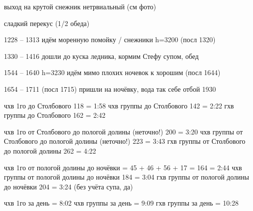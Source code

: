 выход на крутой снежник нетрвиальный (см фото)

сладкий перекус (1/2 обеда)

1228 -- 1313 идём моренную помойку / снежники h=3200 (посл 1320)

1330 -- 1416 дошли до куска ледника, кормим Стефу супом, обед

1544 -- 1640 h=3230 идём мимо плохих ночевок к хорошим (посл 1644)

1654 -- 1711 (посл 1715) пришли на ночёвку, вода так себе
отбой 1930

чхв 1го до Столбового 118 = 1:58
чхв группы до Столбового 142 = 2:22
гхв группы до Столбового 162 = 2:42

чхв 1го от Столбового до пологой долины (неточно!) 200 = 3:20
чхв группы от Столбового до пологой долины (неточно!) 223 = 3:43
гхв группы от Столбового до пологой долины 262 = 4:22

чхв 1го от пологой долины до ночёвки = 45 + 46 + 56 + 17 = 164 = 2:44
чхв группы от пологой долины до ночёвки 184 = 3:04
гхв группы от пологой долины до ночёвки 204 = 3:24 (без учёта супа, да)

чхв 1го за день = 8:02
чхв группы за день = 9:09
гхв группы за день = 10:28
    \FloatBarrier
